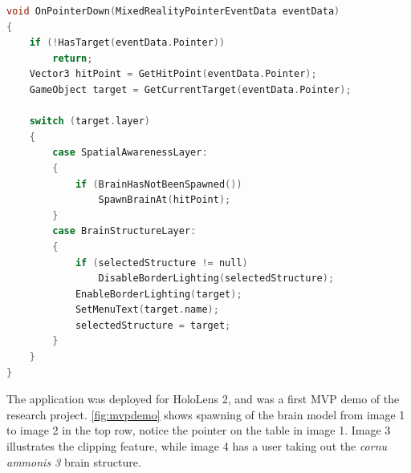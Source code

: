 \newpage
\begin{lstlisting}[language=c, label={item:sudopointer}, caption={A simplified version of the event function called when a \texttt{Ponter} is clicked.}]
void OnPointerDown(MixedRealityPointerEventData eventData)
{
    if (!HasTarget(eventData.Pointer)) 
        return;
    Vector3 hitPoint = GetHitPoint(eventData.Pointer);
    GameObject target = GetCurrentTarget(eventData.Pointer);

    switch (target.layer)
    {
        case SpatialAwarenessLayer:
        {
            if (BrainHasNotBeenSpawned())
                SpawnBrainAt(hitPoint);
        }
        case BrainStructureLayer:
        {
            if (selectedStructure != null)
                DisableBorderLighting(selectedStructure);
            EnableBorderLighting(target);
            SetMenuText(target.name);
            selectedStructure = target;
        }
    }
}
\end{lstlisting}

The application was deployed for HoloLens 2, and was a first MVP demo of the research project. \autoref{fig:mvpdemo} shows spawning of the brain model from image 1 to image 2 in the top row, notice the pointer on the table in image 1. Image 3 illustrates the clipping feature, while image 4 has a user taking out the \textit{cornu ammonis 3} brain structure.

